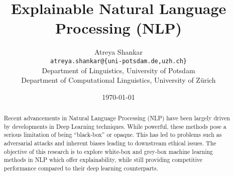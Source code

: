 \documentclass[12pt,a4paper]{article}
\title{Explainable Natural Language Processing (NLP)}
\author{Atreya Shankar\\
\texttt{atreya.shankar@\{uni-potsdam.de,uzh.ch\}} \\
Department of Linguistics, University of Potsdam \\
Department of Computational Linguistics, University of Zürich}
\date{\today}
\begin{document}
\newgeometry{}
\maketitle
\thispagestyle{empty}
\begin{abstract}
  Recent advancements in Natural Language Processing (NLP) have been largely driven by developments in Deep Learning techniques. While powerful, these methods pose a serious limitation of being ``black-box'' or opaque. This has led to problems such as adversarial attacks and inherent biases leading to downstream ethical issues. The objective of this research is to explore white-box and grey-box machine learning methods in NLP which offer explainability, while still providing competitive performance compared to their deep learning counterparts.
\end{abstract}
\tableofcontents
\newpage
\restoregeometry
\setcounter{page}{1}
\thispagestyle{plain}

\newpage
{}


\nocite{*}
\end{document}
